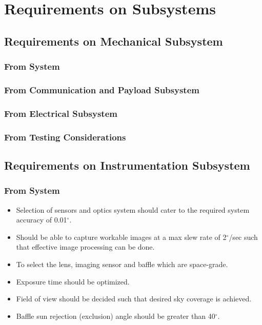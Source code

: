 \documentclass[../../main.tex]{subfiles}
\begin{document}
\chapter{Requirements on Subsystems}
\thispagestyle{fancy}

\section{Requirements on Mechanical Subsystem}
\subsection{From System}
\subsection{From Communication and Payload Subsystem}  
\subsection{From Electrical Subsystem}
\subsection {From Testing Considerations} 


\newpage
\section{Requirements on Instrumentation Subsystem}
\subsection{From System}
\begin{itemize}
    \item Selection of sensors and optics system should cater to the required system accuracy of 0.01$^{\circ}$.
    \item Should be able to capture workable images at a max slew rate of 2$^{\circ}$/sec such that effective image processing can be done.
    \item To select the lens, imaging sensor and baffle which are space-grade.
    \item Exposure time should be optimized.
    \item Field of view should be decided such that desired sky coverage is achieved.
    \item Baffle sun rejection (exclusion) angle should be greater than 40$^{\circ}$.
\end{itemize}
\end{document}
